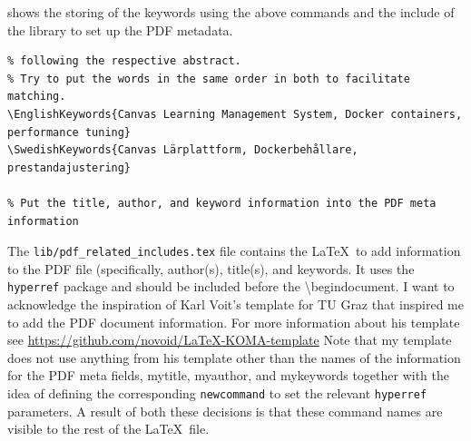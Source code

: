  shows the storing of the keywords using the above commands and the include of the library to set up the PDF metadata.
\begin{lstlisting}[language={[LaTeX]TeX}, caption={shows the storing of the keywords using the above commands and the include of the library to set up the PDF meta data}, label=lst:storingkeywords]
% Enter the English and Swedish keywords here for use in the PDF meta data _and_ for later use
% following the respective abstract.
% Try to put the words in the same order in both to facilitate matching.
\EnglishKeywords{Canvas Learning Management System, Docker containers, performance tuning}
\SwedishKeywords{Canvas Lärplattform, Dockerbehållare, prestandajustering}

% Put the title, author, and keyword information into the PDF meta information

\end{lstlisting}


The \texttt{lib/pdf\_related\_includes.tex} file contains the \LaTeX~to add information
to the PDF file (specifically, author(s), title(s), and keywords. It uses the
\texttt{hyperref} package and should be included before the \textbackslash begin{document}.
I want to acknowledge the inspiration of Karl Voit's template for TU Graz that inspired me to add the PDF document information. For more information about his template see \url{https://github.com/novoid/LaTeX-KOMA-template}
Note that my template does not use anything from his template other than the names of the information for the PDF meta fields, \ie mytitle, myauthor, and mykeywords together with the idea of defining the corresponding \texttt{newcommand} to set the relevant \texttt{hyperref} parameters. A result of both these decisions is that these command names are visible to the rest of the \LaTeX~file.

